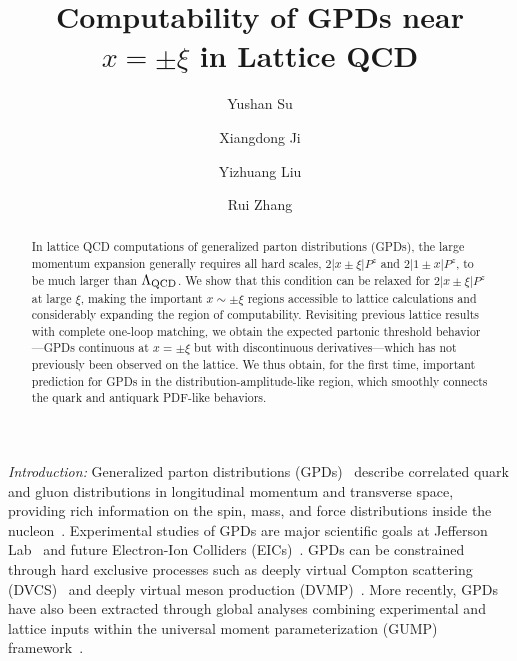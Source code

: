 \documentclass[prl,aps,twocolumn,preprintnumbers, showpacs, nofootinbib,superscriptaddress,notitlepage]{revtex4-1}
\begin{document}
\title{Computability of GPDs near $x=\pm\xi$ in Lattice QCD}

\author{Yushan Su}

\author{Xiangdong Ji}

\author{Yizhuang Liu}

\author{Rui Zhang}

\begin{abstract}
In lattice QCD computations of generalized parton distributions (GPDs), 
the large momentum expansion generally requires all hard scales, 
$2|x\pm\xi|P^z$ and $2|1\pm x|P^z$, to be much larger than 
$\Lambda_{\rm QCD}$. We show that this condition can be relaxed for 
$2|x\pm\xi|P^z$ at large $\xi$, making the important $x\sim\pm\xi$ regions accessible to lattice calculations and considerably expanding the region of computability. Revisiting previous lattice results with 
complete one-loop matching, we obtain the expected partonic threshold 
behavior---GPDs continuous at $x=\pm\xi$ but with discontinuous 
derivatives---which has not previously been observed on the lattice. 
We thus obtain, for the first time, important prediction for GPDs in the 
distribution-amplitude-like region, which smoothly connects the quark and 
antiquark PDF-like behaviors.

\end{abstract}

\maketitle

\textit{Introduction:}
Generalized parton distributions (GPDs)~\cite{Muller:1994ses,Ji:1996ek,Ji:2016djn} describe correlated quark and gluon distributions in longitudinal momentum and transverse space, providing rich information on the spin, mass, and force distributions inside the nucleon~\cite{Ji:1996ek,Ji:2021mtz,Polyakov:2018zvc}. Experimental studies of GPDs are major scientific goals at Jefferson Lab~\cite{Dudek:2012vr} and future Electron-Ion Colliders (EICs)~\cite{Accardi:2012qut,AbdulKhalek:2021gbh,Anderle:2021wcy}. GPDs can be constrained through hard exclusive processes such as deeply virtual Compton scattering (DVCS)~\cite{Ji:1996ek,Ji:1996nm} and deeply virtual meson production (DVMP)~\cite{Radyushkin:1996ru,Collins:1996fb,Mankiewicz:1997uy}. More recently, GPDs have also been extracted through global analyses combining experimental and lattice inputs within the universal moment parameterization (GUMP) framework~\cite{Guo:2022upw,Guo:2023ahv,Zhang:2024djl,Guo:2024wxy,Guo:2025muf}.
\end{document}

